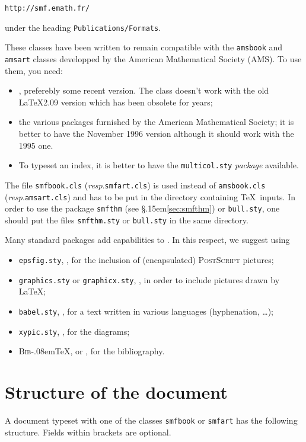 \documentclass[10 pt,english]{smfart}
\newcommand{\BibTeX}{{\scshape Bib}\kern-.08em\TeX}
\newcommand{\T}{\S\kern .15em\relax }
\newcommand{\resp}{\emph{resp}.\xspace}
\begin{document}
\texttt{http://smf.emath.fr/}

\noindent under the heading \verb|Publications/Formats|.

\smallskip
These classes have been written to remain compatible
with the \texttt{amsbook} and \texttt{amsart} classes developped
by the American Mathematical Society (AMS). To use them, you need:
\begin{itemize}
\item \LaTeXe, preferebly some recent version. The class
doesn't work with the old \LaTeX 2.09 version which has been obsolete for years;
\item the various packages furnished by the American Mathematical
Society; it is better to have the November 1996 version
although it should work with the 1995 one.
\item
To typeset an index, it is better to have the
\texttt{multicol.sty} {\em package} available.
\end{itemize}
The file \texttt{smfbook.cls} (\resp \texttt{smfart.cls}) is used instead of  \texttt{amsbook.cls} (\resp \texttt{amsart.cls}) and has to be put in the directory containing \TeX\ inputs. In order to use the package \texttt{smfthm} (see \T\ref{sec:smfthm}) or \texttt{bull.sty}, one should put the files \texttt{smfthm.sty} or \texttt{bull.sty} in the same directory.

Many standard packages add capabilities to \LaTeXe. In this respect, we suggest using
\begin{itemize}
\item \texttt{epsfig.sty}, \cite{epsfig}, for the inclusion of (encapsulated) {\scshape PostScript} pictures;
\item \texttt{graphics.sty} or \texttt{graphicx.sty}, \cite{graphics,graphicx}, in order to include pictures drawn by \LaTeX;
\item \texttt{babel.sty}, \cite{babel}, for a text written in various languages (hyphenation, \ldots);
\item \texttt{xypic.sty}, 
\cite{xypic}, for the diagrams;
\item {\BibTeX}, \cite[Appendix B]{lamport94} or \cite{hypatia},
for the bibliography.
\end{itemize}

\section{Structure of the document}\label{sec:struct}

A document typeset with one of the classes 
\texttt{smfbook} or \texttt{smfart} has the following structure.
Fields within brackets are optional.
\end{document}
